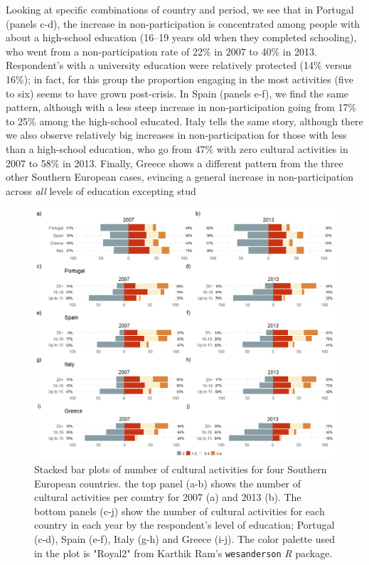 \documentclass{article}
\begin{document}
Looking at specific combinations of country and period, we see that in Portugal (panels c-d), the increase in non-participation is concentrated among people with about a high-school education (16–19 years old when they completed schooling), who went from a non-participation rate of 22\% in 2007 to 40\% in 2013. Respondent's with a university education were relatively protected (14\% versus 16\%); in fact, for this group the proportion engaging in the most activities (five to six) seems to have grown post-crisis. In Spain (panels e-f), we find the same pattern, although with a less steep increase in non-participation going from 17\% to 25\% among the high-school educated. Italy tells the same story, although there we also observe relatively big increases in non-participation for those with less than a high-school education, who go from 47\% with zero cultural activities in 2007 to 58\% in 2013. Finally, Greece shows a different pattern from the three other Southern European cases, evincing a general increase in non-participation across {\em all} levels of education excepting stud

\begin{figure}
    \centering
    \includegraphics[width=1.0\textwidth]{Plots/cult-cat2-by-year-by-country-combo.png}
    \caption{Stacked bar plots of number of cultural activities for four Southern European countries. the top panel (a-b) shows the number of cultural activities per country for 2007 (a) and 2013 (b). The bottom panels (c-j) show the number of cultural activities for each country in each year by the respondent's level of education; Portugal (c-d), Spain (e-f), Italy (g-h) and Greece (i-j). The color palette used in the plot is "Royal2" from Karthik Ram's \citeyearpar{Ram_wespalette} \texttt{wesanderson} {\em R} package.}
    \label{fig: main}
\end{figure}


\end{document}
